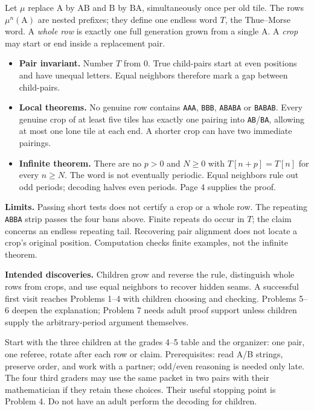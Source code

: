 \documentclass[11pt,letterpaper]{article}
\newcommand{\head}[1]{\par\vspace{5pt}{\large\bfseries #1}\par\nopagebreak\vspace{1pt}}
\newcommand{\word}[1]{\texttt{#1}}
\newcommand{\A}{\mathrm{A}}
\newcommand{\B}{\mathrm{B}}
\begin{document}
\fontsize{10.5pt}{13.1pt}\selectfont

\head{Mathematical destination}
Let $\mu$ replace $\A$ by $\A\B$ and $\B$ by $\B\A$, simultaneously once per old tile. The rows $\mu^n(\A)$ are nested prefixes; they define one endless word $T$, the Thue--Morse word. A \emph{whole row} is exactly one full generation grown from a single $\A$. A \emph{crop} may start or end inside a replacement pair.

\begin{itemize}
\item \textbf{Pair invariant.} Number $T$ from 0. True child-pairs start at even positions and have unequal letters. Equal neighbors therefore mark a gap between child-pairs.
\item \textbf{Local theorems.} No genuine row contains \word{AAA}, \word{BBB}, \word{ABABA} or \word{BABAB}. Every genuine crop of at least five tiles has exactly one pairing into \word{AB}/\word{BA}, allowing at most one lone tile at each end. A shorter crop can have two immediate pairings.
\item \textbf{Infinite theorem.} There are no $p>0$ and $N\geq0$ with $T[n+p]=T[n]$ for every $n\geq N$. The word is not eventually periodic. Equal neighbors rule out odd periods; decoding halves even periods. Page 4 supplies the proof.
\end{itemize}
\textbf{Limits.} Passing short tests does not certify a crop or a whole row. The repeating \word{ABBA} strip passes the four bans above. Finite repeats do occur in $T$; the claim concerns an endless repeating tail. Recovering pair alignment does not locate a crop's original position. Computation checks finite examples, not the infinite theorem.

\textbf{Intended discoveries.} Children grow and reverse the rule, distinguish whole rows from crops, and use equal neighbors to recover hidden seams. A successful first visit reaches Problems 1--4 with children choosing and checking. Problems 5--6 deepen the explanation; Problem 7 needs adult proof support unless children supply the arbitrary-period argument themselves.

\head{Who uses this prototype}
Start with the three children at the grades 4--5 table and the organizer: one pair, one referee, rotate after each row or claim. Prerequisites: read A/B strings, preserve order, and work with a partner; odd/even reasoning is needed only late. The four third graders may use the same packet in two pairs with their mathematician if they retain these choices. Their useful stopping point is Problem 4. Do not have an adult perform the decoding for children.
\end{document}
